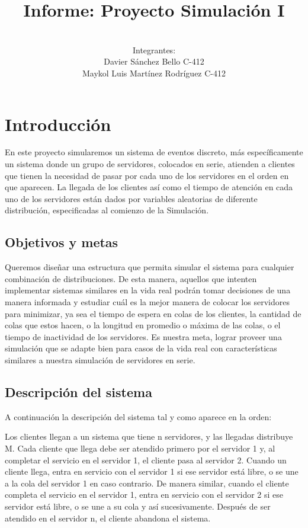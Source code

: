 \documentclass[12pt]{article}
\title{Informe: Proyecto Simulación I}
\author{
\vspace{3cm}\\
  Integrantes:\\
  Davier Sánchez Bello C-412\\
  Maykol Luis Martínez Rodríguez C-412
}
\begin{document}
\maketitle
\newpage
\section{Introducción}
En este proyecto simularemos un sistema de eventos discreto, más específicamente un sistema donde un grupo de servidores, colocados en serie, atienden a clientes que tienen la necesidad de pasar por cada uno de los servidores en el orden en que aparecen. La llegada de los clientes así como el tiempo de atención en cada uno de los servidores están dados por variables aleatorias de diferente distribución, especificadas al comienzo de la Simulación.

\subsection{Objetivos y metas}
Queremos diseñar una estructura que permita simular el sistema para cualquier combinación de distribuciones. De esta manera, aquellos que intenten implementar sistemas similares en la vida real podrán tomar decisiones de una manera informada y estudiar cuál es la mejor manera de colocar los servidores para minimizar, ya sea el tiempo de espera en colas de los clientes, la cantidad de colas que estos hacen, o la longitud en promedio o máxima de las colas, o el tiempo de inactividad de los servidores.
Es nuestra meta, lograr proveer una simulación que se adapte bien para casos de la vida real con características similares a nuestra simulación de servidores en serie. 

\subsection{Descripción del sistema}
A continuación la descripción del sistema tal y como aparece en la orden:

Los clientes llegan a un sistema que tiene n servidores, y las llegadas distribuye M. Cada cliente que llega debe ser atendido primero por el servidor 1 y, al completar el servicio en el servidor 1, el cliente pasa al servidor 2.
Cuando un cliente llega, entra en servicio con el servidor 1 si ese servidor está libre, o se une a la cola del servidor 1 en caso contrario. De manera similar, cuando el cliente completa el servicio en el servidor 1, entra en servicio con el servidor 2 si ese servidor está libre, o se une a su cola y así sucesivamente. Después de ser atendido en el servidor n, el cliente abandona el sistema.
\end{document}
